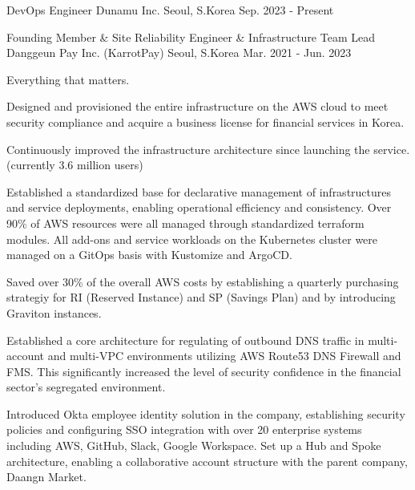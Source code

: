 

\begin{cventries}

  \cventry
    {DevOps Engineer} %
    {Dunamu Inc.} %
    {Seoul, S.Korea} %
    {Sep. 2023 - Present} %
    {
    }

  \cventry
    {Founding Member \& Site Reliability Engineer \& Infrastructure Team Lead} %
    {Danggeun Pay Inc. (KarrotPay)} %
    {Seoul, S.Korea} %
    {Mar. 2021 - Jun. 2023} %
    {
      \begin{cvitems} %
        \item {Everything that matters.}
        \item {Designed and provisioned the entire infrastructure on the AWS cloud to meet security compliance and acquire a business license for financial services in Korea.}
        \item {Continuously improved the infrastructure architecture since launching the service. (currently 3.6 million users)}
        \item {Established a standardized base for declarative management of infrastructures and service deployments, enabling operational efficiency and consistency. Over 90\% of AWS resources were all managed through standardized terraform modules. All add-ons and service workloads on the Kubernetes cluster were managed on a GitOps basis with Kustomize and ArgoCD.}
        \item {Saved over 30\% of the overall AWS costs by establishing a quarterly purchasing strategiy for RI (Reserved Instance) and SP (Savings Plan) and by introducing Graviton instances.}
        \item {Established a core architecture for regulating of outbound DNS traffic in multi-account and multi-VPC environments utilizing AWS Route53 DNS Firewall and FMS. This significantly increased the level of security confidence in the financial sector's segregated environment.}
        \item {Introduced Okta employee identity solution in the company, establishing security policies and configuring SSO integration with over 20 enterprise systems including AWS, GitHub, Slack, Google Workspace. Set up a Hub and Spoke architecture, enabling a collaborative account structure with the parent company, Daangn Market.}
      \end{cvitems}
    }


\end{cventries}
